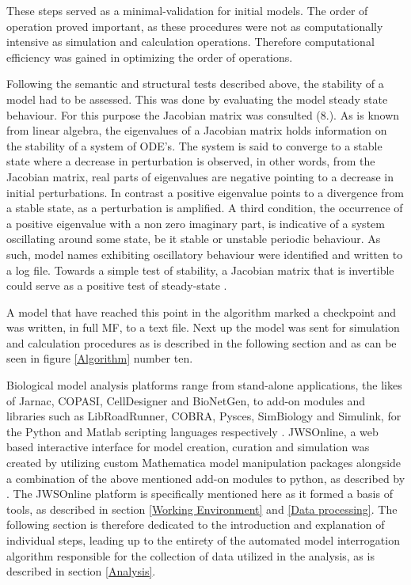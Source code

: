 These steps served as a minimal-validation for initial models. The order of operation proved important, as these procedures were not as computationally intensive as simulation and calculation operations. Therefore computational efficiency was gained in optimizing the order of operations. 

Following the semantic and structural tests described above, the stability of a model had to be assessed. This was done by evaluating the model steady state behaviour. For this purpose the Jacobian matrix was consulted (8.). As is known from linear algebra, the eigenvalues of a Jacobian matrix holds information on the stability of a system of ODE's. The system is said to converge to a stable state where a decrease in perturbation is observed, in other words, from the Jacobian matrix, real parts of eigenvalues are negative pointing to a decrease in initial perturbations. In contrast a positive eigenvalue points to a divergence from a stable state, as a perturbation is amplified. A third condition, the occurrence of a positive eigenvalue with a non zero imaginary part, is indicative of a system oscillating around some state, be it stable or unstable periodic behaviour. As such, model names exhibiting oscillatory behaviour were identified and written to a log file. Towards a simple test of stability, a Jacobian matrix that is invertible could serve as a positive test of steady-state \cite{Hofmeyr2001}.  

A model that have reached this point in the algorithm marked a checkpoint and was written, in full MF, to a text file. Next up the model was sent for simulation and calculation procedures as is described in the following section and as can be seen in figure \ref{Algorithm} number ten.

Biological model analysis platforms range from stand-alone applications, the likes of Jarnac, COPASI, CellDesigner and BioNetGen, to  add-on modules and libraries such as LibRoadRunner, COBRA, Pysces, SimBiology and Simulink, for the Python and Matlab scripting languages respectively \cite{Sauro2000, Hoops2006, Olivier2005, Somogyi2015, Harris2016, Laurent2017}. JWSOnline, a web based interactive interface for model creation, curation and simulation was created by utilizing custom Mathematica model manipulation packages alongside a combination of the above mentioned add-on modules to python, as described by \cite{Olivier2004, jwsdocs}. The JWSOnline platform is specifically mentioned here as it formed a basis of tools, as described in section \ref{Working Environment} and \ref{Data processing}. The following section is therefore dedicated to the introduction and explanation of individual steps, leading up to the entirety of the automated model interrogation algorithm responsible for the collection of data utilized in the analysis, as is described in section \ref{Analysis}. 

